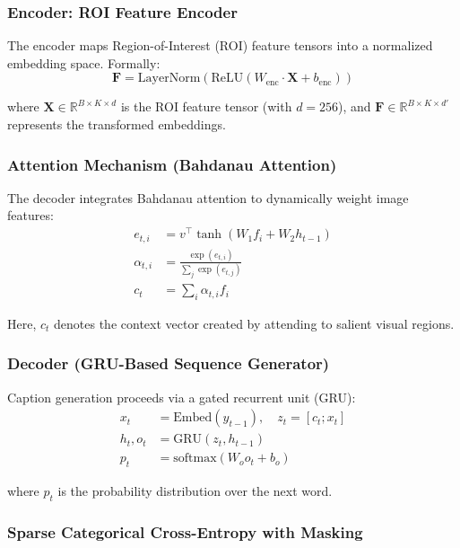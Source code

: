 \subsubsection{Encoder: ROI Feature Encoder}

The encoder maps Region-of-Interest (ROI) feature tensors into a normalized embedding space. Formally:
\begin{equation}
    \mathbf{F} = \text{LayerNorm}(\text{ReLU}(W_{\text{enc}} \cdot \mathbf{X} + b_{\text{enc}}))
\end{equation}

where $\mathbf{X} \in \mathbb{R}^{B \times K \times d}$ is the ROI feature tensor (with $d = 256$), and $\mathbf{F} \in \mathbb{R}^{B \times K \times d'}$ represents the transformed embeddings.

\subsubsection{Attention Mechanism (Bahdanau Attention)}

The decoder integrates Bahdanau attention to dynamically weight image features:
\begin{align}
    e_{t,i} &= v^\top \tanh(W_1 f_i + W_2 h_{t-1}) \\
    \alpha_{t,i} &= \frac{\exp(e_{t,i})}{\sum_j \exp(e_{t,j})} \\
    c_t &= \sum_i \alpha_{t,i} f_i
\end{align}

Here, $c_t$ denotes the context vector created by attending to salient visual regions.

\subsubsection{Decoder (GRU-Based Sequence Generator)}

Caption generation proceeds via a gated recurrent unit (GRU):
\begin{align}
    x_t &= \text{Embed}(y_{t-1}), \quad z_t = [c_t; x_t] \\
    h_t, o_t &= \text{GRU}(z_t, h_{t-1}) \\
    p_t &= \text{softmax}(W_o o_t + b_o)
\end{align}

where $p_t$ is the probability distribution over the next word.

\subsubsection{Sparse Categorical Cross-Entropy with Masking}


